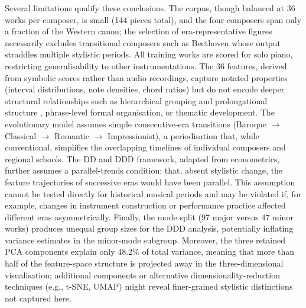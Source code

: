 \documentclass[]{interact}
\theoremstyle{plain}
\theoremstyle{definition}
\theoremstyle{remark}
\begin{document}
Several limitations qualify these conclusions. The corpus, though balanced
at 36 works per composer, is small (144 pieces total), and the four
composers span only a fraction of the Western canon; the selection of
era-representative figures necessarily excludes transitional composers
such as Beethoven whose output straddles multiple stylistic periods. All
training works are scored for solo piano, restricting generalisability to
other instrumentations. The 36 features, derived from symbolic scores
rather than audio recordings, capture notated properties (interval
distributions, note densities, chord ratios) but do not encode deeper
structural relationships such as
hierarchical grouping and prolongational structure
\citep{LerdahlJackendoff1983}, phrase-level formal organisation, or
thematic development. The evolutionary model assumes simple
consecutive-era transitions (Baroque $\to$ Classical $\to$ Romantic $\to$
Impressionist), a periodisation that, while conventional, simplifies
the overlapping timelines of individual composers and regional schools.
The DD and DDD framework, adapted from econometrics, further assumes a
parallel-trends condition: that, absent stylistic change, the feature
trajectories of successive eras would have been parallel. This assumption
cannot be tested directly for historical musical periods and may be
violated if, for example, changes in instrument construction or
performance practice affected different eras asymmetrically.
Finally, the mode split (97 major versus 47 minor works) produces
unequal group sizes for the DDD analysis, potentially inflating variance
estimates in the minor-mode subgroup. Moreover, the three retained PCA
components explain only 48.2\% of total variance, meaning that more than
half of the feature-space structure is projected away in the
three-dimensional visualisation; additional components or alternative
dimensionality-reduction techniques (e.g., t-SNE, UMAP) might reveal
finer-grained stylistic distinctions not captured here.
\end{document}

